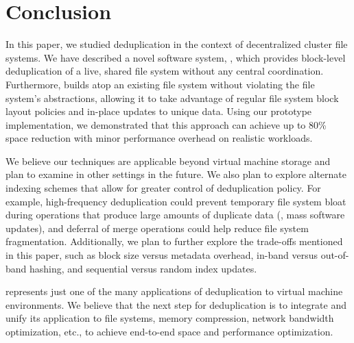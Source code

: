 
\section{Conclusion}
\label{sec:conclusion}

In this paper, we studied deduplication in the context of
decentralized cluster file systems. We have described a novel software
system, \DeDe, which provides block-level deduplication
of a live, shared file system without any central coordination.
Furthermore, \DeDe builds atop an existing file system without
violating the file system's abstractions, allowing it to take
advantage of regular file system block layout policies and in-place
updates to unique data.
Using our prototype implementation, we demonstrated that this approach
can achieve up to 80\% space reduction with minor performance overhead
on realistic workloads.

We believe our techniques are applicable beyond virtual machine
storage and plan to examine \DeDe in other settings in the future.  We
also plan to explore alternate indexing schemes
that allow for greater control of deduplication policy.  For example,
high-frequency deduplication could prevent temporary file system bloat
during operations that produce large amounts of duplicate data (\eg,
mass software updates), and deferral of merge
operations could help reduce file system fragmentation.  Additionally,
we plan to further explore the trade-offs mentioned in this paper,
such as block size versus metadata overhead, in-band versus
out-of-band hashing, and sequential versus random index updates.

\DeDe represents just one of the many applications of deduplication to
virtual machine environments.  We believe that the next step for
deduplication is to integrate and unify its application to file
systems, memory compression, network bandwidth optimization, etc., to
achieve end-to-end space and performance optimization.




%

